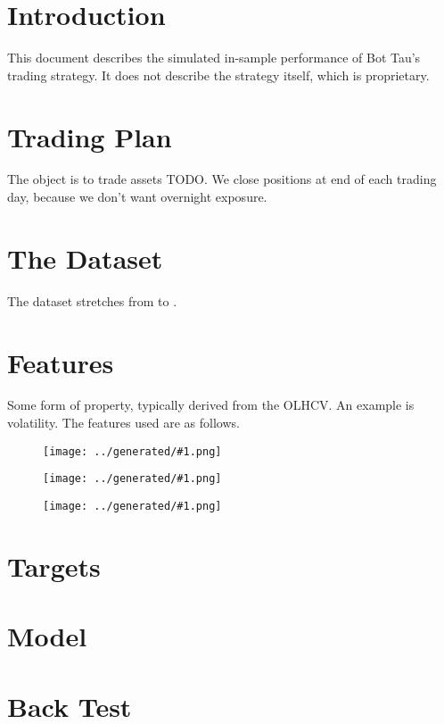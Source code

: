 \documentclass[a4paper]{article}
\title{\documenttitle}
\date{\today}
\author{\name \\
        \href{mailto:fenglich@fastmail.fm}{fenglich@fastmail.fm}}
\newcommand{\figureTau}[1]{
    \begin{figure}[H]
        \begin{center}
            \texttt{[image: ../generated/\#1.png]}
        \end{center}
    \end{figure}
}
\begin{document}
\maketitle

\tableofcontents

\section{Introduction}

This document describes the simulated in-sample performance of Bot Tau's trading
strategy. It does not describe the strategy itself, which is proprietary.

\section{Trading Plan}

The object is to trade assets TODO. We close positions at end of each trading day, because we don't want overnight exposure.

\section{The Dataset}

The dataset stretches from \constantStartdate to \constantEnddate.

\section{Features}

Some form of property, typically derived from the OLHCV. An example is
volatility. The features used are as follows.

\figureTau{feature_BollingerBands}

\figureTau{feature_RSI}

\figureTau{corrmatrix}

\section{Targets}

\section{Model}

\section{Back Test}
\end{document}
